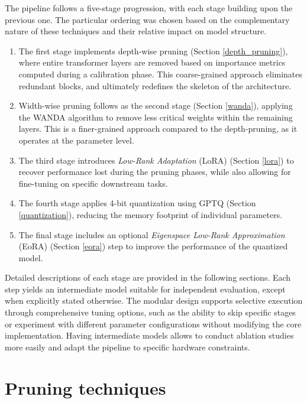 The pipeline follows a five-stage progression, with each stage building upon the previous one. The particular ordering was chosen based on the complementary nature of these techniques and their relative impact on model structure.

\begin{enumerate}
    \item The first stage implements depth-wise pruning (Section \ref{depth_pruning}), where entire transformer layers are removed based on importance metrics computed during a calibration phase. This coarse-grained approach eliminates redundant blocks, and ultimately redefines the skeleton of the architecture.

    \item Width-wise pruning follows as the second stage (Section \ref{wanda}), applying the WANDA algorithm \cite{wanda} to remove less critical weights within the remaining layers. This is a finer-grained approach compared to the depth-pruning, as it operates at the parameter level.

    \item The third stage introduces \textit{Low-Rank Adaptation} (LoRA) \cite{lora} (Section \ref{lora}) to recover performance lost during the pruning phases, while also allowing for fine-tuning on specific downstream tasks.

    \item The fourth stage applies 4-bit quantization using GPTQ \cite{gptq_quantization} (Section \ref{quantization}), reducing the memory footprint of individual parameters.

    \item The final stage includes an optional \textit{Eigenspace Low-Rank Approximation} (EoRA) \cite{eora} (Section \ref{eora}) step to improve the performance of the quantized model.
\end{enumerate}

Detailed descriptions of each stage are provided in the following sections. Each step yields an intermediate model suitable for independent evaluation, except when explicitly stated otherwise. The modular design supports selective execution through comprehensive tuning options, such as the ability to skip specific stages or experiment with different parameter configurations without modifying the core implementation. Having intermediate models allows to conduct ablation studies more easily and adapt the pipeline to specific hardware constraints.

\section{Pruning techniques} \label{pruning}

